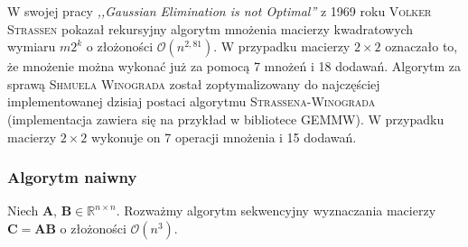 W swojej pracy \emph{,,Gaussian Elimination is not Optimal''} z 1969 roku \textsc{Volker Strassen} pokazał rekursyjny algorytm mnożenia macierzy kwadratowych wymiaru \(m2^k\) o złożoności \(\mathcal{O}(n^{2,81})\)\cite{Strassen68}. W przypadku macierzy \(2\times 2\) oznaczało to, że mnożenie można wykonać już za pomocą 7 mnożeń i 18 dodawań. Algorytm za sprawą \textsc{Shmuela Winograda} został zoptymalizowany\cite{Winograd}\cite{Loeckx1974} do najczęściej implementowanej dzisiaj postaci algorytmu \textsc{Strassena-Winograda} (implementacja zawiera się na przykład w bibliotece GEMMW\cite{Douglas94gemmw}). W przypadku macierzy \(2\times 2\) wykonuje on 7 operacji mnożenia i 15 dodawań\cite{DBLP:journals/corr/abs-1202-3173}.

\subsubsection{Algorytm naiwny}
Niech \(\mathbf{A}\), \(\mathbf{B}\in\mathbb{R}^{n\times n}\). Rozważmy algorytm sekwencyjny wyznaczania macierzy \(\mathbf{C}=\mathbf{AB}\) o złożoności \(\mathcal{O}(n^3)\).


\newpage

